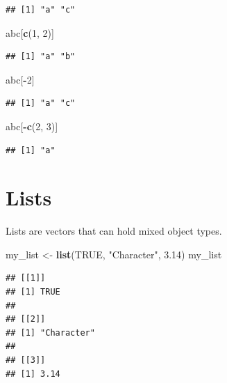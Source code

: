 \documentclass[openany]{book}
\newenvironment{Shaded}{\begin{snugshade}}{\end{snugshade}}
\newcommand{\DecValTok}[1]{\textcolor[rgb]{0.00,0.00,0.81}{#1}}
\newcommand{\FloatTok}[1]{\textcolor[rgb]{0.00,0.00,0.81}{#1}}
\newcommand{\KeywordTok}[1]{\textcolor[rgb]{0.13,0.29,0.53}{\textbf{#1}}}
\newcommand{\NormalTok}[1]{#1}
\newcommand{\OperatorTok}[1]{\textcolor[rgb]{0.81,0.36,0.00}{\textbf{#1}}}
\newcommand{\OtherTok}[1]{\textcolor[rgb]{0.56,0.35,0.01}{#1}}
\newcommand{\StringTok}[1]{\textcolor[rgb]{0.31,0.60,0.02}{#1}}
\begin{document}
\begin{verbatim}
## [1] "a" "c"
\end{verbatim}

\begin{Shaded}
\begin{Highlighting}[]
\NormalTok{abc[}\KeywordTok{c}\NormalTok{(}\DecValTok{1}\NormalTok{, }\DecValTok{2}\NormalTok{)]}
\end{Highlighting}
\end{Shaded}

\begin{verbatim}
## [1] "a" "b"
\end{verbatim}

\begin{Shaded}
\begin{Highlighting}[]
\NormalTok{abc[}\OperatorTok{-}\DecValTok{2}\NormalTok{]}
\end{Highlighting}
\end{Shaded}

\begin{verbatim}
## [1] "a" "c"
\end{verbatim}

\begin{Shaded}
\begin{Highlighting}[]
\NormalTok{abc[}\OperatorTok{-}\KeywordTok{c}\NormalTok{(}\DecValTok{2}\NormalTok{, }\DecValTok{3}\NormalTok{)]}
\end{Highlighting}
\end{Shaded}

\begin{verbatim}
## [1] "a"
\end{verbatim}

\hypertarget{lists}{%
\section{Lists}\label{lists}}

Lists are vectors that can hold mixed object types.

\begin{Shaded}
\begin{Highlighting}[]
\NormalTok{my_list <-}\StringTok{ }\KeywordTok{list}\NormalTok{(}\OtherTok{TRUE}\NormalTok{, }\StringTok{"Character"}\NormalTok{, }\FloatTok{3.14}\NormalTok{)}
\NormalTok{my_list}
\end{Highlighting}
\end{Shaded}

\begin{verbatim}
## [[1]]
## [1] TRUE
## 
## [[2]]
## [1] "Character"
## 
## [[3]]
## [1] 3.14
\end{verbatim}
\end{document}
